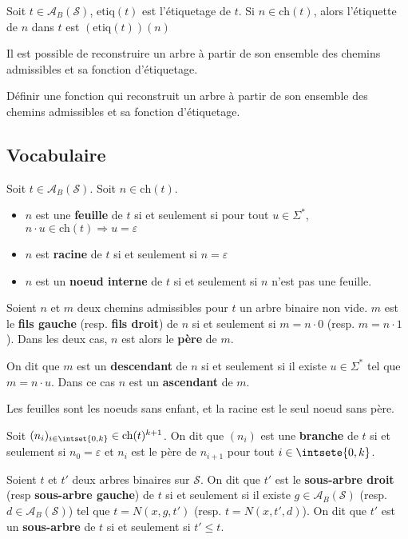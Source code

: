 \documentclass{scrartcl}
\begin{document}
			Soit $t \in \mathscr{A}_B(\mathcal{S})$, $\text{etiq}(t)$ est l'étiquetage de $t$.
			Si $n \in \text{ch}(t)$, alors l'étiquette de $n$ dans $t$ est $\left(\text{etiq}(t)\right)(n)$

			\rem Il est possible de reconstruire un arbre à partir de son ensemble des chemins admissibles et sa fonction d'étiquetage.

			\exo Définir une fonction qui reconstruit un arbre à partir de son ensemble des chemins admissibles et sa fonction d'étiquetage.

		
		\subsection{Vocabulaire}
			Soit $t \in \mathscr{A}_B(\mathcal{S})$.
			Soit $n \in \text{ch}(t)$.
			\begin{itemize}
				\item $n$ est une \textbf{feuille} de $t$ si et seulement si pour tout $u \in \Sigma^*$, $n\cdot u \in \text{ch}(t) \Rightarrow u=\varepsilon$
				\item $n$ est \textbf{racine} de $t$ si et seulement si $n = \varepsilon$
				\item $n$ est un \textbf{noeud interne} de $t$ si et seulement si $n$ n'est pas une feuille.
			\end{itemize}
			
			
			Soient $n$ et $m$ deux chemins admissibles pour $t$ un arbre binaire non vide.
			$m$ est le \textbf{fils gauche} (resp. \textbf{fils droit}) de $n$ si et seulement si $m = n\cdot 0$ (resp. $m = n \cdot 1$).
			Dans les deux cas, $n$ est alors le \textbf{père} de $m$.

			On dit que $m$ est un \textbf{descendant} de $n$ si et seulement si il existe $u \in \Sigma^*$ tel que $m = n \cdot u$.
			Dans ce cas $n$ est un \textbf{ascendant} de $m$.

			\rem Les feuilles sont les noeuds sans enfant, et la racine est le seul noeud sans père.

			Soit $(n_i)_{i \in \intset{0,k}} \in \text{ch}(t)^{k+1}$.
			On dit que $(n_i)$ est une \textbf{branche} de $t$ si et seulement si $n_0 = \varepsilon$ et $n_i$ est le père de $n_{i+1}$ pour tout $i \in \intsete{0,k}$.
			
			Soient $t$ et $t'$ deux arbres binaires sur $\mathcal{S}$. On dit que $t'$ est le \textbf{sous-arbre droit} (resp \textbf{sous-arbre gauche}) de $t$
			si et seulement si il existe $g \in \mathscr{A}_B(\mathcal{S})$ (resp. $d \in \mathscr{A}_B(\mathcal{S})$) tel que $t = N(x,g,t')$ (resp. $t = N(x,t',d)$).
			On dit que $t'$ est un \textbf{sous-arbre} de $t$ si et seulement si $t' \leq t$.
\end{document}

